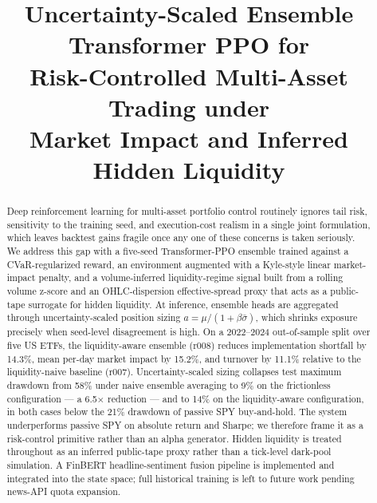 \documentclass[conference]{IEEEtran}
\begin{document}
\title{Uncertainty-Scaled Ensemble Transformer PPO for\\
Risk-Controlled Multi-Asset Trading under\\
Market Impact and Inferred Hidden Liquidity}

\author{
}

\maketitle

\begin{abstract}
Deep reinforcement learning for multi-asset portfolio control routinely
ignores tail risk, sensitivity to the training seed, and execution-cost
realism in a single joint formulation, which leaves backtest gains
fragile once any one of these concerns is taken seriously. We address
this gap with a five-seed Transformer-PPO ensemble trained against a
CVaR-regularized reward, an environment augmented with a Kyle-style
linear market-impact penalty, and a volume-inferred liquidity-regime
signal built from a rolling volume z-score and an OHLC-dispersion
effective-spread proxy that acts as a public-tape surrogate for hidden
liquidity. At inference, ensemble heads are aggregated through
uncertainty-scaled position sizing $a = \mu/(1+\beta\bar\sigma)$, which
shrinks exposure precisely when seed-level disagreement is high. On a
2022--2024 out-of-sample split over five US ETFs, the liquidity-aware
ensemble (r008) reduces implementation shortfall by 14.3\%, mean
per-day market impact by 15.2\%, and turnover by 11.1\% relative to the
liquidity-naive baseline (r007). Uncertainty-scaled sizing collapses
test maximum drawdown from 58\% under naive ensemble averaging to 9\%
on the frictionless configuration --- a 6.5$\times$ reduction --- and
to 14\% on the liquidity-aware configuration, in both cases below the
21\% drawdown of passive SPY buy-and-hold. The system underperforms
passive SPY on absolute return and Sharpe; we therefore frame it as a
risk-control primitive rather than an alpha generator. Hidden liquidity
is treated throughout as an inferred public-tape proxy rather than a
tick-level dark-pool simulation. A FinBERT headline-sentiment fusion
pipeline is implemented and integrated into the state space; full
historical training is left to future work pending news-API quota
expansion.
\end{abstract}
\end{document}
